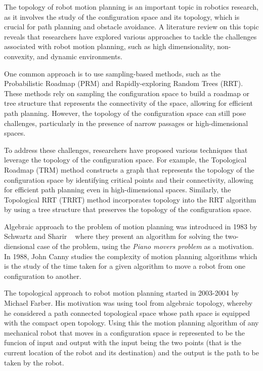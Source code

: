 The topology of robot motion planning is an important topic in robotics research, as it involves the study of the configuration space and its topology, which is crucial for path planning and obstacle avoidance. A literature review on this topic reveals that researchers have explored various approaches to tackle the challenges associated with robot motion planning, such as high dimensionality, non-convexity, and dynamic environments.

One common approach is to use sampling-based methods, such as the Probabilistic Roadmap (PRM) and Rapidly-exploring Random Trees (RRT). These methods rely on sampling the configuration space to build a roadmap or tree structure that represents the connectivity of the space, allowing for efficient path planning. However, the topology of the configuration space can still pose challenges, particularly in the presence of narrow passages or high-dimensional spaces.

To address these challenges, researchers have proposed various techniques that leverage the topology of the configuration space. For example, the Topological Roadmap (TRM) method constructs a graph that represents the topology of the configuration space by identifying critical points and their connectivity, allowing for efficient path planning even in high-dimensional spaces. Similarly, the Topological RRT (TRRT) method incorporates topology into the RRT algorithm by using a tree structure that preserves the topology of the configuration space.

Algebraic approach to the problem of motion planning was introduced in 1983 by Schwartz and Sharir ~\cite{schwartz:1983a} where they present an algorithm for solving the two-diensional case of the problem, using the \textit{Piano movers problem} as a motivation. In 1988, John Canny studies the complexity of motion planning algorithms which is the study of the time taken for a given algorithm to move a robot from one configuration to another.

The topological approach to robot motion planning started in 2003-2004 by Michael Farber. His motivation was using tool from algebraic topology, whereby he considered a path connected topological space whose path space is equipped with the compact open topology. Using this the motion planning algorithm of any mechanical robot that moves in a configuration space is represented to be the funcion of input and output with the input being the two points (that is the current location of the robot and its destination) and the output is the path to be taken by the robot.

